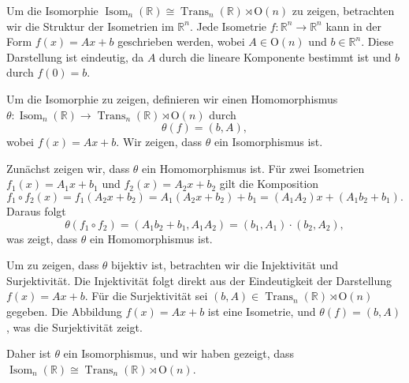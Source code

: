 Um die Isomorphie $\operatorname{Isom}_n(\mathbb{R}) \cong \operatorname{Trans}_n(\mathbb{R}) \rtimes \mathrm{O}(n)$ zu zeigen, betrachten wir die Struktur der Isometrien im $\mathbb{R}^n$. Jede Isometrie $f: \mathbb{R}^n \to \mathbb{R}^n$ kann in der Form $f(x) = Ax + b$ geschrieben werden, wobei $A \in \mathrm{O}(n)$ und $b \in \mathbb{R}^n$. Diese Darstellung ist eindeutig, da $A$ durch die lineare Komponente bestimmt ist und $b$ durch $f(0) = b$.

Um die Isomorphie zu zeigen, definieren wir einen Homomorphismus $\theta: \operatorname{Isom}_n(\mathbb{R}) \to \operatorname{Trans}_n(\mathbb{R}) \rtimes \mathrm{O}(n)$ durch
\[
\theta(f) = (b, A),
\]
wobei $f(x) = Ax + b$. Wir zeigen, dass $\theta$ ein Isomorphismus ist.

Zunächst zeigen wir, dass $\theta$ ein Homomorphismus ist. Für zwei Isometrien $f_1(x) = A_1 x + b_1$ und $f_2(x) = A_2 x + b_2$ gilt die Komposition
\[
f_1 \circ f_2(x) = f_1(A_2 x + b_2) = A_1(A_2 x + b_2) + b_1 = (A_1 A_2)x + (A_1 b_2 + b_1).
\]
Daraus folgt
\[
\theta(f_1 \circ f_2) = (A_1 b_2 + b_1, A_1 A_2) = (b_1, A_1) \cdot (b_2, A_2),
\]
was zeigt, dass $\theta$ ein Homomorphismus ist.

Um zu zeigen, dass $\theta$ bijektiv ist, betrachten wir die Injektivität und Surjektivität. Die Injektivität folgt direkt aus der Eindeutigkeit der Darstellung $f(x) = Ax + b$. Für die Surjektivität sei $(b, A) \in \operatorname{Trans}_n(\mathbb{R}) \rtimes \mathrm{O}(n)$ gegeben. Die Abbildung $f(x) = Ax + b$ ist eine Isometrie, und $\theta(f) = (b, A)$, was die Surjektivität zeigt.

Daher ist $\theta$ ein Isomorphismus, und wir haben gezeigt, dass $\operatorname{Isom}_n(\mathbb{R}) \cong \operatorname{Trans}_n(\mathbb{R}) \rtimes \mathrm{O}(n)$.

